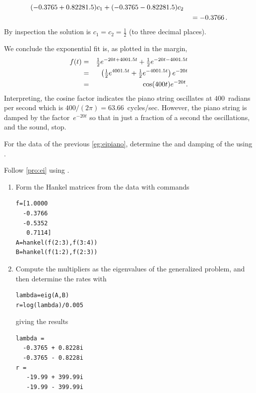 \begin{reduce}
\begin{example}
\begin{solution}
\begin{enumerate}
\begin{eqnarray*}
(-0.3765 + 0.82281.5)c_1+(-0.3765 - 0.82281.5)c_2
\\&&{}
=-0.3766\,.
\end{eqnarray*}
By inspection the solution is \(c_1=c_2=\tfrac12\) (to three decimal places).
\end{enumerate}
%
We conclude the exponential fit is, as plotted in the margin,
\begin{eqnarray*}
f(t)&=&\tfrac12e^{-20t+4001.5 t}+\tfrac12e^{-20t-4001.5 t}
\\&=&\left(\tfrac12e^{4001.5 t}+\tfrac12e^{-4001.5 t}\right)e^{-20t}
\\&=&\cos(400t)e^{-20t}.
\end{eqnarray*}
Interpreting, the cosine factor indicates the piano string oscillates at \(400\)~radians per second which is \(400/(2\pi)=63.66\)~cycles/sec.
%
However, the piano string is damped by the factor~\(e^{-20t}\) so that in just a fraction of a second the oscillations, and the sound, stop.
\end{solution}
\end{example}




\begin{example} \label{eg:eipianu}
For the data of the previous \autoref{eg:eipiano}, determine the  and damping of the  using \script.

\begin{solution} 
Follow \autoref{pro:ei} using \script. 
\begin{enumerate}
\item Form the Hankel matrices from the data with commands
\begin{verbatim}
f=[1.0000
  -0.3766
  -0.5352
   0.7114]
A=hankel(f(2:3),f(3:4))
B=hankel(f(1:2),f(2:3))
\end{verbatim}
\setbox\ajrqrbox\hbox{}%
\marginajrbox%

\item Compute the multipliers as the eigenvalues of the generalized problem, and then determine the rates with
\begin{verbatim}
lambda=eig(A,B)
r=log(lambda)/0.005
\end{verbatim}
giving the results
\begin{verbatim}
lambda =
  -0.3765 + 0.8228i
  -0.3765 - 0.8228i
r =
   -19.99 + 399.99i
   -19.99 - 399.99i
\end{verbatim}



\end{enumerate}
\end{solution}
\end{example}
\end{reduce}
